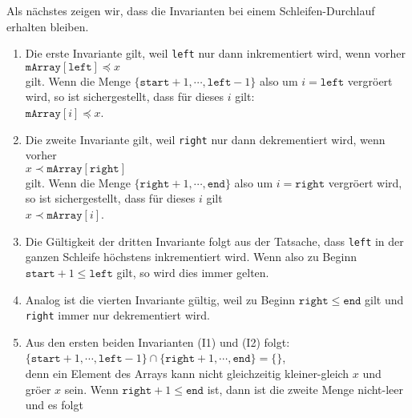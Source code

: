 \noindent
Als n\"achstes zeigen wir, dass die Invarianten bei einem Schleifen-Durchlauf erhalten
bleiben.  
\begin{enumerate}
\item Die erste Invariante gilt, weil \texttt{left} nur dann inkrementiert wird,
      wenn vorher \\[0.2cm]
      \hspace*{1.3cm} $\texttt{mArray}[\texttt{left}] \preceq x$ \\[0.2cm]
      gilt.  Wenn die Menge $\{\mathtt{start}+1, \cdots, \mathtt{left}-1\}$ also um 
      $i = \mathtt{left}$ vergr\"o\3ert wird, so ist sichergestellt, dass f\"ur dieses $i$ gilt:
      \\[0.2cm]
      \hspace*{1.3cm} $\texttt{mArray}[i] \preceq x$.
\item Die zweite Invariante gilt, weil \texttt{right} nur dann dekrementiert wird,
      wenn vorher \\[0.2cm]
      \hspace*{1.3cm} $x \prec \texttt{mArray}[\texttt{right}]$ \\[0.2cm]
      gilt.  Wenn die Menge $\{\mathtt{right}+1, \cdots, \mathtt{end}\}$ also um 
      $i = \mathtt{right}$ vergr\"o\3ert wird, so ist sichergestellt, dass f\"ur dieses $i$ gilt
      \\[0.2cm]
      \hspace*{1.3cm} $x \prec \texttt{mArray}[i]$.
\item Die G\"ultigkeit der dritten Invariante folgt aus der Tatsache, dass \texttt{left}
      in der ganzen Schleife h\"ochstens inkrementiert wird.  Wenn also zu Beginn 
      $\mathtt{start} + 1 \leq \mathtt{left}$ gilt, so wird dies immer gelten.  
\item Analog ist die vierten Invariante g\"ultig, weil zu Beginn $\mathtt{right} \leq \mathtt{end}$ gilt und
      \texttt{right} immer nur dekrementiert wird.
\item Aus den ersten beiden Invarianten (I1) und (I2) folgt: \\[0.2cm]
      \hspace*{1.3cm} 
      $\{ \mathtt{start}+1, \cdots, \mathtt{left} - 1 \} \cap \{ \mathtt{right}+1, \cdots, \mathtt{end} \} = \{\}$,
      \\[0.2cm]
      denn ein Element des Arrays kann nicht gleichzeitig kleiner-gleich $x$ und 
      gr\"o\3er $x$ sein.
      Wenn $\texttt{right} + 1 \leq \texttt{end}$ ist, dann ist die zweite Menge
      nicht-leer und es folgt \\[0.2cm]

\end{enumerate}

